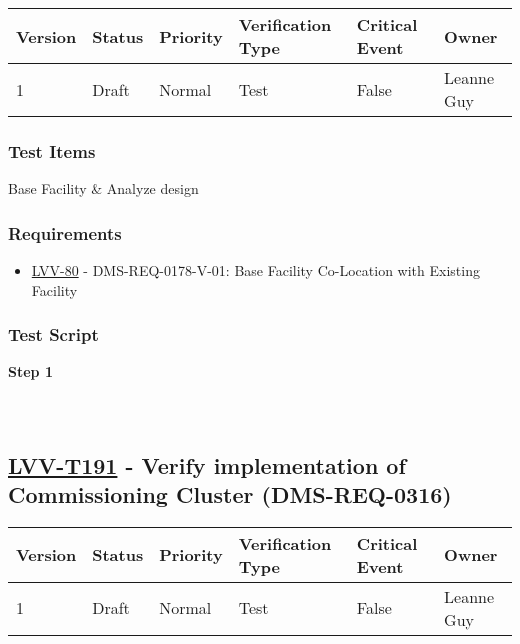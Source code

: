 \begin{longtable}[]{@{}llllll@{}}
\toprule
Version & Status & Priority & Verification Type & Critical Event &
Owner\tabularnewline
\midrule
\endhead
1 & Draft & Normal & Test & False & Leanne Guy\tabularnewline
\bottomrule
\end{longtable}

\hypertarget{test-items-90}{%
\subsubsection{Test Items}\label{test-items-90}}

Base Facility \& Analyze design

\hypertarget{requirements-90}{%
\subsubsection{Requirements}\label{requirements-90}}

\begin{itemize}
\tightlist
\item
  \href{https://jira.lsstcorp.org/browse/LVV-80}{LVV-80} -
  DMS-REQ-0178-V-01: Base Facility Co-Location with Existing Facility
\end{itemize}

\hypertarget{test-script-90}{%
\subsubsection{Test Script}\label{test-script-90}}

\textbf{Step 1}\\
~\\
~\\

\hypertarget{lvv-t191---verify-implementation-of-commissioning-cluster-dms-req-0316}{%
\subsection{\texorpdfstring{\href{https://jira.lsstcorp.org/secure/Tests.jspa\#/testCase/LVV-T191}{LVV-T191}
- Verify implementation of Commissioning Cluster
(DMS-REQ-0316)}{LVV-T191 - Verify implementation of Commissioning Cluster (DMS-REQ-0316)}}\label{lvv-t191---verify-implementation-of-commissioning-cluster-dms-req-0316}}

\begin{longtable}[]{@{}llllll@{}}
\toprule
Version & Status & Priority & Verification Type & Critical Event &
Owner\tabularnewline
\midrule
\endhead
1 & Draft & Normal & Test & False & Leanne Guy\tabularnewline
\bottomrule
\end{longtable}


